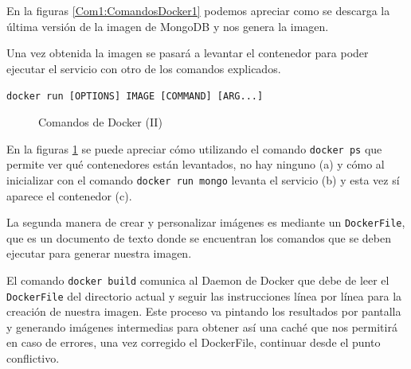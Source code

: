 En la figuras \ref{Com1:ComandosDocker1} podemos apreciar como se descarga la última versión de la imagen de MongoDB y nos genera la imagen. 

Una vez obtenida la imagen se pasará a levantar el contenedor para poder ejecutar el servicio con otro de los comandos explicados. 

\begin{center}
\texttt{docker run [OPTIONS] IMAGE [COMMAND] [ARG...]}
\end{center}
\pagebreak 

\begin{figure}[htb]
\begin{center}
\caption{Comandos de Docker (II)}
\label{Com2:ComandosDocker2}
\end{center}
\end{figure}


En la figuras \ref{Com2:ComandosDocker2} se puede apreciar cómo utilizando el comando \texttt{docker ps} que
permite ver qué contenedores están levantados, no hay ninguno (a) y cómo al inicializar con el comando  \texttt{docker run mongo} levanta el servicio (b) y esta vez sí aparece el contenedor (c).

La segunda manera de crear y personalizar imágenes es mediante un \texttt{DockerFile}, que es un documento de texto donde se encuentran los comandos que se deben ejecutar para generar nuestra imagen.

El comando \texttt{docker build} comunica al Daemon de Docker que debe de leer el \texttt{DockerFile} del directorio actual y seguir las instrucciones línea por línea para la creación de nuestra imagen. Este proceso va pintando los resultados por pantalla y generando imágenes intermedias para obtener así una caché que nos permitirá en caso de errores, una vez corregido el DockerFile, continuar desde el punto conflictivo. 

